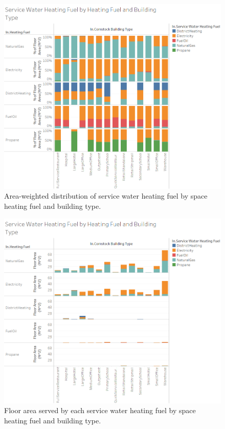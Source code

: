 \begin{figure}[ht!]
  \centering
  \includegraphics[width=\textwidth]{figures/swh_fuel_dist.png}
  \caption[Distribution of service water heating fuel by space heating fuel and building type]{Area-weighted distribution of service water heating fuel by space heating fuel and building type.}
  \label{fig:swh_fuel_dist}
\end{figure}

\begin{figure}[ht!]
  \centering
  \includegraphics[width=\textwidth]{figures/swh_fuel_area.png}
  \caption[Floor area served by each service water heating fuel by space heating fuel and building type]{Floor area served by each service water heating fuel by space heating fuel and building type.}
  \label{fig:swh_fuel_area}
\end{figure}

